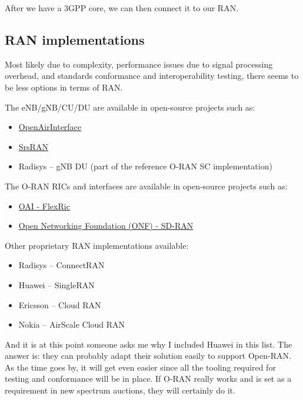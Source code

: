 \documentclass{article}
\begin{document}
        After we have a 3GPP core, we can then connect it to our RAN.

    \subsection{RAN implementations}
        Most likely due to complexity, performance issues due to signal processing overhead, and
        standards conformance and interoperability testing, there seems to be less options in terms of RAN.

        The eNB/gNB/CU/DU are available in open-source projects such as:
        \begin{itemize}
            \item \href{https://openairinterface.org}{OpenAirInterface}
            \item \href{https://www.srsran.com/}{SrsRAN}
            \item Radisys – gNB DU (part of the reference O-RAN SC implementation)
        \end{itemize}

        The O-RAN RICs and interfaces are available in open-source projects such as:
        \begin{itemize}
             \item \href{https://openairinterface.org/mosaic5g/}{OAI - FlexRic}
             \item \href{https://opennetworking.org/open-ran/}{Open Networking Foundation (ONF) - SD-RAN}
        \end{itemize}

        Other proprietary RAN implementations available:
        \begin{itemize}
            \item Radisys – ConnectRAN
            \item Huawei – SingleRAN
            \item Ericsson – Cloud RAN
            \item Nokia – AirScale Cloud RAN
        \end{itemize}

        And it is at this point someone asks me why I included Huawei in this list.
        The answer is: they can probably adapt their solution easily to support Open-RAN.
        As the time goes by, it will get even easier since all the tooling required for
        testing and conformance will be in place.
        If O-RAN really works and is set as a requirement in new spectrum auctions,
        they will certainly do it.
\end{document}

